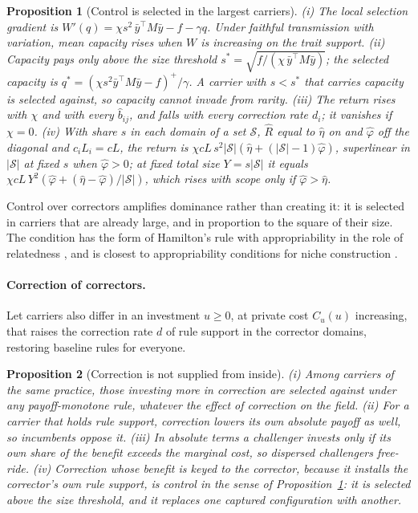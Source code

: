\documentclass[letterpaper]{article} %
\newtheorem{proposition}{Proposition}
\theoremstyle{definition}
\newcommand{\cS}{\mathcal{S}}
\begin{document}
\begin{proposition}[Control is selected in the largest carriers]\label{prop:control}
(i) The local selection gradient is $W'(q)=\chi s^2\,\bar y^\top M\bar y-f-\gamma q$. Under faithful transmission with variation, mean capacity rises when $W$ is increasing on the trait support. (ii) Capacity pays only above the size threshold $s^\ast=\sqrt{f/(\chi\,\bar y^\top M\bar y)}$; the selected capacity is $q^\ast=(\chi s^2\bar y^\top M\bar y-f)^+/\gamma$. A carrier with $s<s^\ast$ that carries capacity is selected against, so capacity cannot invade from rarity. (iii) The return rises with $\chi$ and with every $\hat b_{ij}$, and falls with every correction rate $d_i$; it vanishes if $\chi=0$. (iv) With share $s$ in each domain of a set $\cS$, $\hat R$ equal to $\hat\eta$ on and $\hat\varphi$ off the diagonal and $c_iL_i=cL$, the return is $\chi cL\,s^2|\cS|(\hat\eta+(|\cS|-1)\hat\varphi)$, superlinear in $|\cS|$ at fixed $s$ when $\hat\varphi>0$; at fixed total size $Y=s|\cS|$ it equals $\chi cL\,Y^2(\hat\varphi+(\hat\eta-\hat\varphi)/|\cS|)$, which rises with scope only if $\hat\varphi>\hat\eta$.
\end{proposition}

Control over correctors amplifies dominance rather than creating it: it is selected in carriers that are already large, and in proportion to the square of their size. The condition has the form of Hamilton's rule with appropriability in the role of relatedness \citep{hamilton1964,price1970}, and is closest to appropriability conditions for niche construction \citep{krakauer2009,lehmann2008,gerlee2015}.

\paragraph{Correction of correctors.} Let carriers also differ in an investment $u\ge0$, at private cost $C_u(u)$ increasing, that raises the correction rate $d$ of rule support in the corrector domains, restoring baseline rules for everyone.

\begin{proposition}[Correction is not supplied from inside]\label{prop:correction}
(i) Among carriers of the same practice, those investing more in correction are selected against under any payoff-monotone rule, whatever the effect of correction on the field. (ii) For a carrier that holds rule support, correction lowers its own absolute payoff as well, so incumbents oppose it. (iii) In absolute terms a challenger invests only if its own share of the benefit exceeds the marginal cost, so dispersed challengers free-ride. (iv) Correction whose benefit is keyed to the corrector, because it installs the corrector's own rule support, is control in the sense of Proposition~\ref{prop:control}: it is selected above the size threshold, and it replaces one captured configuration with another.
\end{proposition}
\end{document}
